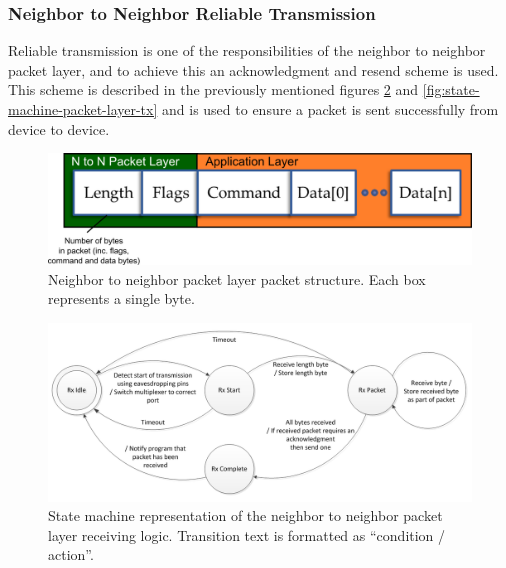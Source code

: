 \subsubsection{Neighbor to Neighbor Reliable Transmission}

Reliable transmission is one of the responsibilities of the neighbor to neighbor packet layer, and to achieve this an acknowledgment and resend scheme is used. This scheme is described in the previously mentioned figures \ref{fig:state-machine-packet-layer-rx} and  \ref{fig:state-machine-packet-layer-tx} and is used to ensure a packet is sent successfully from device to device.


\begin{figure}[h]
	\centering
	\includegraphics[width=1.0\textwidth]{Figures/neighbor-neighbor-packet.png}
	\caption{Neighbor to neighbor packet layer packet structure. Each box represents a single byte.}
	\label{fig:neighbor-neighbor-packet}    
\end{figure}

\begin{figure}[h]
	\centering
	\includegraphics[width=1.0\textwidth]{Figures/state-machine-packet-layer-rx.png}
	\caption{State machine representation of the neighbor to neighbor packet layer receiving logic. Transition text is formatted as ``condition / action''.}
	\label{fig:state-machine-packet-layer-rx}    
\end{figure}

